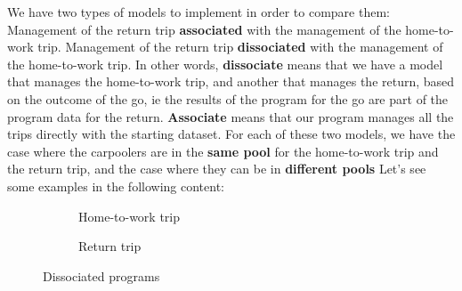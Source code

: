 \documentclass[12pt, a4paper,twoside]{memoir}
\newcommand{\newpar}{\vskip 0.2in \noindent}
\begin{document}
	We have two types of models to implement in order to compare them: \newline
	Management of the return trip \textbf{associated} with the management of the home-to-work trip. \newline
	Management of the return trip \textbf{dissociated} with the management of the home-to-work trip.
	\newpar
	In other words, \textbf{dissociate} means that we have a model that manages the home-to-work trip, and another that manages the return, based on the outcome of the go, ie the results of the program for the go are part of the program data for the return. \textbf{Associate} means that our program manages all the trips directly with the starting dataset.
	\newpar
	For each of these two models, we have the case where the carpoolers are in the \textbf{same pool} for the home-to-work trip and the return trip, and the case where they can be in \textbf{different pools}
	\newpar
	Let's see some examples in the following content:
	\begin{figure}[H]
		\centering
		\begin{subfigure}{.5\textwidth}
			\centering
			\caption{Home-to-work trip}
		\end{subfigure}%
		\begin{subfigure}{.5\textwidth}
			\centering
			\caption{Return trip}
		\end{subfigure}
		\caption{Dissociated programs}
		\label{fig:dissociated programs}
	\end{figure}
	
\end{document}
